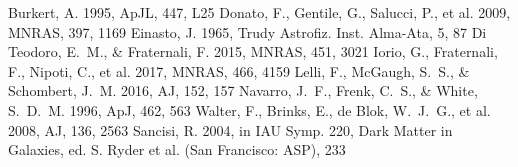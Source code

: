 \documentclass[twocolumn]{aastex631}
\begin{document}
\begin{thebibliography}{}
 Burkert, A. 1995, ApJL, 447, L25
 Donato, F., Gentile, G., Salucci,
P., et al. 2009, MNRAS, 397, 1169
 Einasto, J. 1965, Trudy Astrofiz. Inst.
Alma-Ata, 5, 87
 Di Teodoro, E.~M., \& Fraternali, F. 2015, MNRAS, 451, 3021
 Iorio, G., Fraternali, F., Nipoti, C., et al. 2017, MNRAS, 466, 4159
 Lelli, F., McGaugh, S.~S., \&
Schombert, J.~M. 2016, AJ, 152, 157
 Navarro, J.~F., Frenk, C.~S., \&
White, S.~D.~M. 1996, ApJ, 462, 563
 Walter, F., Brinks, E., de Blok, W.~J.~G., et al. 2008, AJ, 136, 2563
 Sancisi, R. 2004, in IAU Symp. 220,
Dark Matter in Galaxies, ed. S. Ryder et al. (San Francisco: ASP), 233
\end{thebibliography}
\end{document}
